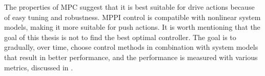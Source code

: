 The properties of \ac{MPC} suggest that it is best suitable for drive actions because of easy tuning and robustness. \Ac{MPPI} control is compatible with nonlinear system models, making it more suitable for push actions. It is worth mentioning that the goal of this thesis is not to find the best optimal controller. The goal is to gradually, over time, choose control methods in combination with system models that result in better performance, and the performance is measured with various metrics, discussed in .\bs


%
